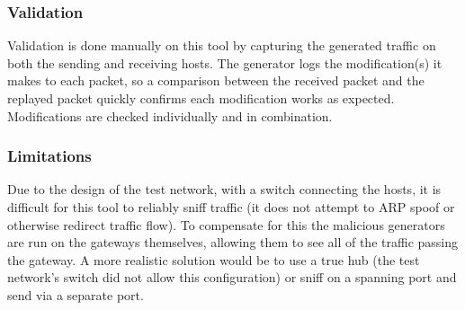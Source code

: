 \subsubsection{Validation}
\par Validation is done manually on this tool by capturing the generated traffic on both the sending and receiving hosts. The generator logs the modification(s) it makes to each packet, so a comparison between the received packet and the replayed packet quickly confirms each modification works as expected. Modifications are checked individually and in combination.

\subsubsection{Limitations}
\par Due to the design of the test network, with a switch connecting the hosts, it is difficult for this tool to reliably sniff traffic (it does not attempt to \ac{ARP} spoof or otherwise redirect traffic flow). To compensate for this the malicious generators are run on the gateways themselves, allowing them to see all of the traffic passing the gateway. A more realistic solution would be to use a true hub (the test network's switch did not allow this configuration) or sniff on a spanning port and send via a separate port.

